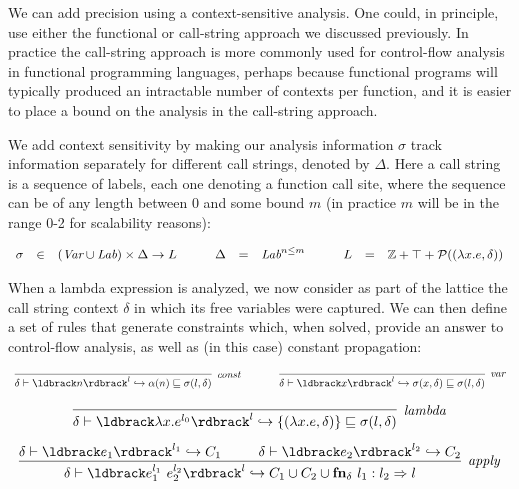 \documentclass[11pt]{article}
\begin{document}
We can add precision using a context-sensitive analysis. One could, in
principle, use either the functional or call-string approach we discussed
previously. In practice the call-string approach is more commonly used for
control-flow analysis in functional programming languages, perhaps because
functional programs will typically produced an intractable number of contexts
per function, and it is easier to place a bound on the analysis in the
call-string approach.

We add context sensitivity by making our analysis information $\sigma$ track
information separately for different call strings, denoted by $\Delta$. Here a
call string is a sequence of labels, each one denoting a function call site,
where the sequence can be of any length between 0 and some bound $m$ (in
practice $m$ will be in the range 0-2 for scalability reasons):

\[
\begin{array}{lllllllllll}

\sigma & \in & (\textit{Var} \cup \textit{Lab}) \times \Delta \rightarrow L & ~~~ &
\Delta & = & \textit{Lab}^{n \leq m} & ~~~ &
 L  & = & \mathbb{Z} + \top + \mathcal{P}((\lambda x . e, \delta))
\end{array}
\]


When a lambda expression is analyzed, we now consider as part of the lattice the call string context $\delta$ in which its free variables were captured.
%
We can then define a set of rules that generate constraints which, when solved, provide an answer to control-flow analysis, as well as (in this case) constant propagation:

\[
\begin{array}{ccc}
\infer[\textit{const}]
	{\delta \vdash \parg{n}^l \hookrightarrow \alpha(n) \alap \sigma(l, \delta)}
	{}
	& ~~~~~ &
	
\infer[\textit{var}]
	{\delta \vdash \parg{x}^l \hookrightarrow \sigma(x, \delta) \alap \sigma(l, \delta)}
	{}\\
\end{array}
\]

\[
\begin{array}{c}
\infer[\textit{lambda}]
	{\delta \vdash \parg{\lambda x . e^{l_0}}^l \hookrightarrow \{(\lambda x . e, \delta)\} \alap \sigma(l, \delta)}
	{}\\[2ex]
	
\infer[\textit{apply}]
	{\delta \vdash \parg{e_1^{l_1} ~ e_2^{l_2}}^l \hookrightarrow C_1 \cup C_2
    \cup \textbf{fn}_\delta~l_1: l_2 \Rightarrow l}
	{
		\delta \vdash \parg{e_1}^{l_1} \hookrightarrow C_1 ~~~~~~~~ \delta \vdash \parg{e_2}^{l_2} \hookrightarrow C_2
	}\\[3ex]
	
\end{array}
\]
\end{document}
